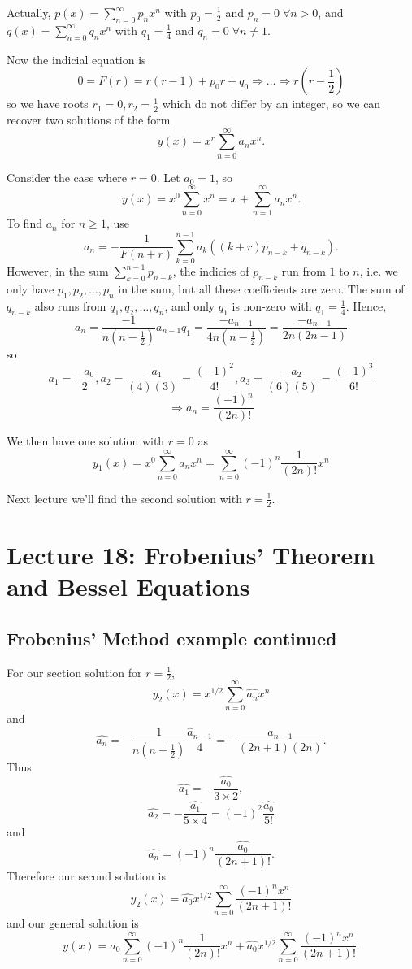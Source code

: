 \documentclass[11pt]{article}
\newcommand{\sumseries}{\sum_{n=0}^{\infty}}
\newcommand{\sumseriesone}{\sum_{n=1}^{\infty}}
\begin{document}
	Actually, $p(x) = \sumseries p_n x^n$ with $p_0 = \frac{1}{2}$ and $p_n = 0 \; \forall n > 0$, and $q(x) = \sumseries q_n x^n$ with $q_1 = \frac{1}{4}$ and $q_n = 0 \; \forall n \neq 1$.

	Now the indicial equation is
		$$ 0 = F(r) = r (r -1) + p_0 r + q_0 \Rightarrow \ldots \Rightarrow r \left(r - \frac{1}{2}\right) $$
	so we have roots $r_1 = 0, r_2 = \frac{1}{2}$ which do not differ by an integer, so we can recover two solutions of the form
		$$ y(x) = x^r \sumseries a_n x^n. $$

	Consider the case where $r = 0$. Let $a_0 = 1$, so
		$$ y(x) = x^0 \sumseries x^n = x + \sumseriesone a_n x^n .$$
	To find $a_n$ for $n \geq 1$, use
		$$ a_n = - \frac{1}{F(n+r)} \sum_{k=0}^{n-1} a_k ((k+r) p_{n-k} + q_{n-k}) .$$
	However, in the sum $\sum_{k = 0}^{n-1} p_{n-k}$, the indicies of $p_{n-k}$ run from $1$ to $n$, i.e. we only have $p_1, p_2, \ldots, p_n$ in the sum, but all these coefficients are zero. The sum of $q_{n-k}$ also runs from $q_1, q_2, \ldots, q_n$, and only $q_1$ is non-zero with $q_1 = \frac{1}{4}$. Hence,
		$$ a_n = \frac{-1}{n \left( n -\frac{1}{2} \right)} a_{n-1}{q_1} = \frac{- a_{n-1}}{4n \left( n - \frac{1}{2} \right)} = \frac{-a_{n-1}}{2n(2n - 1)} $$
	so
		$$ a_1 = \frac{-a_0}{2}, a_2 = \frac{-a_1}{(4)(3)} = \frac{(-1)^2}{4!}, a_3 = \frac{-a_2}{(6)(5)} = \frac{(-1)^3}{6!} $$
		$$ \Rightarrow a_n = \frac{(-1)^n}{(2n)!} $$

	We then have one solution with $r=0$ as
		$$ y_1(x) = x^0 \sumseries a_n x^n = \sumseries (-1)^n \frac{1}{(2n)!} x^n $$

	Next lecture we'll find the second solution with $r = \frac{1}{2}$.

\section{Lecture 18: Frobenius' Theorem and Bessel Equations}
\subsection{Frobenius' Method example continued}
	For our section solution for $r = \frac{1}{2}$,
		$$ y_2 (x) = x^{1/2} \sumseries \hat{a_n} x^n $$
	and
		$$ \hat{a_n} = - \frac{1}{n (n+\frac{1}{2})} \frac{\hat{a}_{n-1}}{4} = - \frac{\hat{a}_{n-1}}{(2n+1)(2n)} .$$
	Thus
		$$ \hat{a_1} = - \frac{\hat{a_0}}{3 \times 2} ,$$
		$$ \hat{a_2} = - \frac{\hat{a_1}}{5 \times 4} = (-1)^2 \frac{\hat{a_0}}{5!} $$
	and
		$$ \hat{a_n} = (-1)^n \frac{\hat{a_0}}{(2n+1)!} .$$
	Therefore our second solution is
		$$ y_2 (x) = \hat{a_0} x^{1/2} \sumseries \frac{(-1)^n x^n}{(2n+1)!} $$
	and our general solution is
		$$ \boxed{y(x) = a_0 \sumseries (-1)^n \frac{1}{(2n)!} x^n + \hat{a_0} x^{1/2} \sumseries \frac{(-1)^n x^n}{(2n+1)!}}. $$
\end{document}
